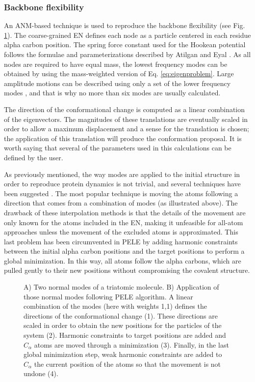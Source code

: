 \subsubsection{Backbone flexibility}

An ANM-based technique \cite{cossins_exploration_2012} is used to reproduce the backbone flexibility (see Fig. \ref{fig:ANM_PELE_schematic}). The coarse-grained EN defines each node as a particle centered in each residue alpha carbon position. The spring force constant used for the Hookean potential follows the formulae and parameterizations described by Atilgan \cite{atilgan_anisotropy_2001} and Eyal \cite{eyal_anisotropic_2006}. As all nodes are required to have equal mass, the lowest frequency modes can be obtained by using the mass-weighted version of Eq. \ref{eq:eigenproblem}. Large amplitude motions can be described using only a set of the lower frequency modes \cite{kitao_effects_1991, meireles_pre-existing_2011}, and that is why no more than six modes are usually calculated.

The direction of the conformational change is computed as a linear combination of the eigenvectors. The magnitudes of these translations are eventually scaled in order to allow a maximum displacement and a sense for the translation is chosen; the application of this translation will produce the conformation proposal. It is worth saying that several of the parameters used in this calculations can be defined by the user.

As previously mentioned, the way modes are applied to the initial structure in order to reproduce protein dynamics is not trivial, and several techniques have been suggested \cite{florence_tama_unveiling_2005}. The most popular technique is moving the atoms following a direction that comes from a combination of modes (as illustrated above). The drawback of these interpolation methods is that the details of the movement are only known for the atoms included in the EN, making it unfeasible for all-atom approaches unless the movement of the excluded atoms is approximated. This last problem has been circumvented in PELE by adding harmonic constraints between the initial alpha carbon positions and the target positions to perform a global minimization. In this way, all atoms follow the alpha carbons, which are pulled gently to their new positions without compromising the covalent structure.

\begin{figure}
\caption{A) Two normal modes of a triatomic molecule. B) Application of those normal modes following PELE algorithm. A linear combination of the modes (here with weights 1,1) defines the directions of the conformational change (1). These directions are scaled in order to obtain the new positions for the particles of the system (2). Harmonic constraints to target positions are added and $C_\alpha$ atoms are moved through a minimization (3). Finally, in the last global minimization step, weak harmonic constraints are added to $C_\alpha$ the current position of the atoms so that the movement is not undone (4). 
 }
\label{fig:ANM_PELE_schematic}
\end{figure}

